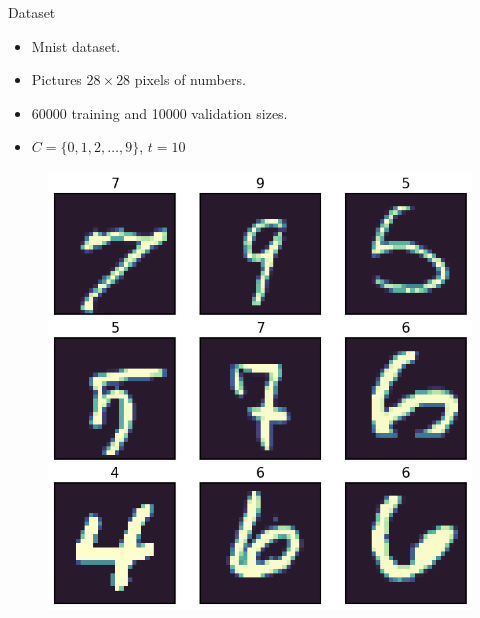 \documentclass{beamer}
\begin{document}
\begin{frame}{Dataset}

\begin{itemize}
	\item Mnist dataset.
	\item Pictures $28 \times 28$ pixels of numbers.
	\item 60000 training and 10000 validation sizes.
	\item $C = \{0, 1, 2, \ldots, 9 \}$, $t = 10$
\end{itemize}

\begin{figure}[h]
    \includegraphics[scale=0.3]{mnist}
\end{figure}

\end{frame}
\end{document}
